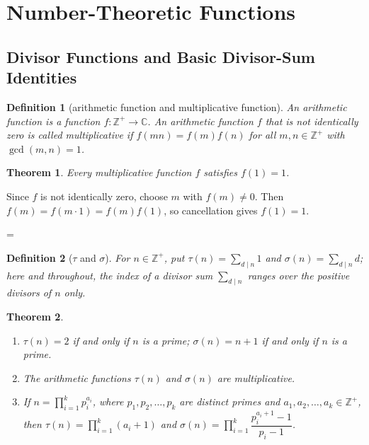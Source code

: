 \documentclass[11pt]{article}
\makeatletter
\theoremstyle{ntstyle}
\newtheorem{theorem}{Theorem}[subsection]
\newtheorem{definition}{Definition}[subsection]
\newcommand{\statementitems}{\mbox{}}
\let\nt@closedisplay\]
\def\nt@guardedclose{\@ifnextchar\par{\nt@closeafterpar}{\@ifnextchar\end{\postdisplaypenalty\@M\nt@closedisplay}{\nt@closedisplay}}}
\def\nt@closeafterpar\par{\@ifnextchar\par{\nt@closeafterpar}{\@ifnextchar\end{\postdisplaypenalty\@M\nt@closedisplay\par}{\nt@closedisplay\par}}}
\renewenvironment{proof}[1][\proofname]{\par
  \pushQED{\qed}\normalfont\topsep\medskipamount\edef\nt@afterproof{\@endparpenalty=\the\@endparpenalty\relax}\@beginparpenalty\@M\@endparpenalty\@M\let\]\nt@guardedclose\trivlist\item[]\textit{#1\@addpunct{.}} \ignorespaces}{\ifvmode\addpenalty\@M\fi\popQED\nt@afterproof\endtrivlist\@endpefalse}
\makeatother
\begin{document}
\section{Number-Theoretic Functions}

\subsection{Divisor Functions and Basic Divisor-Sum Identities}

\begin{definition}[arithmetic function and multiplicative function]\label{def:5.1.1} An
	arithmetic function is a function $f:\mathbb{Z}^+\to\mathbb{C}$. An arithmetic
	function $f$ that is not identically zero is called multiplicative
	if $f(mn)=f(m)f(n)$ for all $m,n\in\mathbb{Z}^+$
	with $\gcd(m, n)=1$.

\end{definition}
\begin{theorem}\label{thm:5.1.1}
	Every multiplicative function $f$ satisfies $f(1)=1$.

\end{theorem}

\begin{proof} Since $f$ is not identically zero, choose $m$ with
	$f(m)\neq0$. Then $f(m)=f(m\cdot1)=f(m)f(1)$, so cancellation gives
	$f(1)=1$.

\end{proof}
\begin{definition}[$\tau$ and $\sigma$]\label{def:5.1.2} For $n \in \mathbb{Z}^+$, put $\tau(n) =
		\sum_{d \mid n} 1$ and $\sigma(n) = \sum_{d \mid n} d$; here and throughout, the index of a divisor sum $\sum_{d \mid n}$ ranges over the positive divisors of $n$ only.

\end{definition}
\begin{theorem}\label{thm:5.1.2}\statementitems

	\begin{enumerate}[label={\alph*)}]
		\item $\tau(n) = 2$ if and only if $n$ is a prime; $\sigma(n) = n
			      + 1$ if and only if $n$ is a prime.
		\item The arithmetic functions $\tau(n)$ and $\sigma(n)$ are multiplicative.
		\item If $n=\prod_{i=1}^{k}p_i^{a_i}$, where $p_1,p_2,\ldots,p_k$
		      are distinct primes and $a_1,a_2,\ldots,a_k\in\mathbb{Z}^+$, then
		      $\tau(n)=\prod_{i=1}^{k}(a_i+1)$ and
		      $\sigma(n)=\prod_{i=1}^{k}\dfrac{p_i^{a_i+1}-1}{p_i-1}$.
	\end{enumerate}

\end{theorem}
\end{document}
